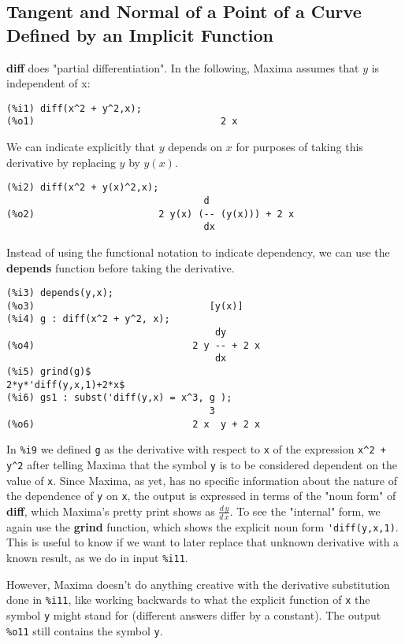 \documentclass[12pt]{article}
\begin{document}
\subsection{Tangent and Normal of a Point of a Curve Defined by an Implicit Function}
\textbf{diff} does "partial differentiation". 
In the following, Maxima assumes that $y$ is independent of x:
\small
\begin{verbatim}
(%i1) diff(x^2 + y^2,x);
(%o1)                                 2 x
\end{verbatim}
\normalsize
\newpage
We can indicate explicitly that $y$ depends on $x$ for purposes of taking
  this derivative by replacing $y$ by $y(x)$.
\small
\begin{verbatim}
(%i2) diff(x^2 + y(x)^2,x);
                                   d
(%o2)                      2 y(x) (-- (y(x))) + 2 x
                                   dx
\end{verbatim}
\normalsize
Instead of using the functional notation to indicate dependency, we can
  use the \textbf{depends} function before taking the derivative.
\small
\begin{verbatim}
(%i3) depends(y,x);
(%o3)                               [y(x)]
(%i4) g : diff(x^2 + y^2, x);
                                     dy
(%o4)                            2 y -- + 2 x
                                     dx
(%i5) grind(g)$
2*y*'diff(y,x,1)+2*x$
(%i6) gs1 : subst('diff(y,x) = x^3, g );
                                    3
(%o6)                            2 x  y + 2 x	
\end{verbatim}
\normalsize
In \verb|%i9| we defined \verb|g| as the derivative with respect to \verb|x|
  of the expression \verb|x^2 + y^2| after telling Maxima that the symbol \verb|y|
  is to be considered dependent on the value of \verb|x|.
Since Maxima, as yet, has no specific information about the nature of the
  dependence of \verb|y| on \verb|x|, the output is expressed in terms of the
  "noun form" of \textbf{diff}, which Maxima's pretty print shows as $\frac{d\,y}{d\,x}$.
To see the "internal" form, we again use the \textbf{grind} function, which shows
  the explicit noun form \verb|'diff(y,x,1)|.
This is useful to know if we want to later replace that unknown derivative with
  a known result, as we do in input \verb|%i11|.

\smallskip
However, Maxima doesn't do anything creative with the derivative substitution
  done in \verb|%i11|, like working backwards to what the explicit function of \verb|x|
  the symbol \verb|y| might stand for (different answers differ by a constant).
The output \verb|%o11| still contains the symbol \verb|y|.
\end{document}
